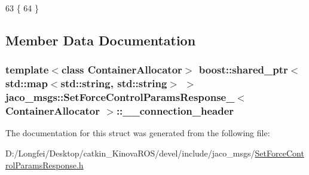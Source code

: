 \begin{DoxyCode}
63     \{
64     \}
\end{DoxyCode}


\subsection{Member Data Documentation}
\subsubsection[{\texorpdfstring{\+\_\+\+\_\+connection\+\_\+header}{__connection_header}}]{\setlength{\rightskip}{0pt plus 5cm}template$<$class Container\+Allocator$>$ boost\+::shared\+\_\+ptr$<$std\+::map$<$std\+::string, std\+::string$>$ $>$ {\bf jaco\+\_\+msgs\+::\+Set\+Force\+Control\+Params\+Response\+\_\+}$<$ Container\+Allocator $>$\+::\+\_\+\+\_\+connection\+\_\+header}\hypertarget{structjaco__msgs_1_1SetForceControlParamsResponse___a76f459bbfdbbe1d78a055c10f2581658}{}\label{structjaco__msgs_1_1SetForceControlParamsResponse___a76f459bbfdbbe1d78a055c10f2581658}


The documentation for this struct was generated from the following file\+:\begin{DoxyCompactItemize}
\item 
D\+:/\+Longfei/\+Desktop/catkin\+\_\+\+Kinova\+R\+O\+S/devel/include/jaco\+\_\+msgs/\hyperlink{SetForceControlParamsResponse_8h}{Set\+Force\+Control\+Params\+Response.\+h}\end{DoxyCompactItemize}
